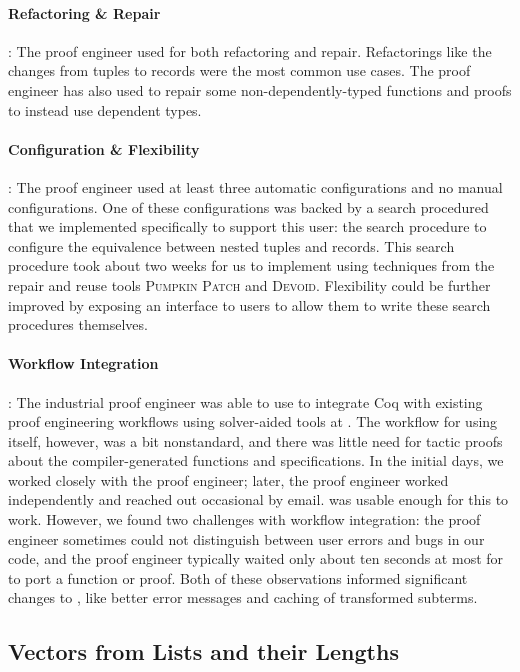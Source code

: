 \paragraph{Refactoring \& Repair}:
The proof engineer used \toolname for both refactoring and repair.
Refactorings like the changes from tuples to records were the most common use cases.
The proof engineer has also used \toolname to repair some non-dependently-typed
functions and proofs to instead use dependent types.

\paragraph{Configuration \& Flexibility}:
The proof engineer used at least three automatic configurations and no manual configurations.
One of these configurations was backed by a search procedured that we implemented
specifically to support this user: the search procedure to
configure the equivalence between nested tuples and records.
This search procedure took about two weeks for us to implement using techniques from
the repair and reuse tools \textsc{Pumpkin Patch} and \textsc{Devoid}.
Flexibility could be further improved by exposing an interface to users to allow them to
write these search procedures themselves.

\paragraph{Workflow Integration}:
The industrial proof engineer was able to use \toolname to integrate Coq with existing proof engineering
workflows using solver-aided tools at \company.
The workflow for using \toolname itself, however, was a bit nonstandard,
and there was little need for tactic proofs about the compiler-generated functions and specifications.
In the initial days, we worked closely with the proof engineer;
later, the proof engineer worked independently and reached out occasional by email.
\toolname was usable enough for this to work.
However, we found two challenges with workflow integration:
the proof engineer sometimes could not distinguish between user errors and bugs in our code,
and the proof engineer typically waited only about ten seconds at most for \toolname
to port a function or proof.
Both of these observations informed significant changes to \toolname, like better error messages
and caching of transformed subterms.

\subsection{Vectors from Lists and their Lengths}
\label{sec:dep}

